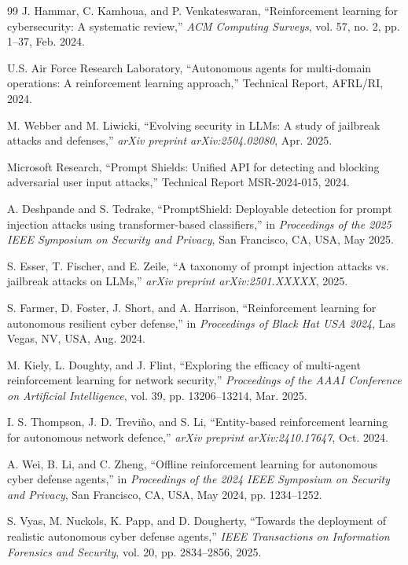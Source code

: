 \documentclass[conference]{IEEEtran}
\begin{document}
\begin{thebibliography}{99}
J. Hammar, C. Kamhoua, and P. Venkateswaran, ``Reinforcement learning for cybersecurity: A systematic review,'' \textit{ACM Computing Surveys}, vol. 57, no. 2, pp. 1--37, Feb. 2024.

U.S. Air Force Research Laboratory, ``Autonomous agents for multi-domain operations: A reinforcement learning approach,'' Technical Report, AFRL/RI, 2024.

M. Webber and M. Liwicki, ``Evolving security in LLMs: A study of jailbreak attacks and defenses,'' \textit{arXiv preprint arXiv:2504.02080}, Apr. 2025.

Microsoft Research, ``Prompt Shields: Unified API for detecting and blocking adversarial user input attacks,'' Technical Report MSR-2024-015, 2024.

A. Deshpande and S. Tedrake, ``PromptShield: Deployable detection for prompt injection attacks using transformer-based classifiers,'' in \textit{Proceedings of the 2025 IEEE Symposium on Security and Privacy}, San Francisco, CA, USA, May 2025.

S. Esser, T. Fischer, and E. Zeile, ``A taxonomy of prompt injection attacks vs. jailbreak attacks on LLMs,'' \textit{arXiv preprint arXiv:2501.XXXXX}, 2025.

S. Farmer, D. Foster, J. Short, and A. Harrison, ``Reinforcement learning for autonomous resilient cyber defense,'' in \textit{Proceedings of Black Hat USA 2024}, Las Vegas, NV, USA, Aug. 2024.

M. Kiely, L. Doughty, and J. Flint, ``Exploring the efficacy of multi-agent reinforcement learning for network security,'' \textit{Proceedings of the AAAI Conference on Artificial Intelligence}, vol. 39, pp. 13206--13214, Mar. 2025.

I. S. Thompson, J. D. Treviño, and S. Li, ``Entity-based reinforcement learning for autonomous network defence,'' \textit{arXiv preprint arXiv:2410.17647}, Oct. 2024.

A. Wei, B. Li, and C. Zheng, ``Offline reinforcement learning for autonomous cyber defense agents,'' in \textit{Proceedings of the 2024 IEEE Symposium on Security and Privacy}, San Francisco, CA, USA, May 2024, pp. 1234--1252.

S. Vyas, M. Nuckols, K. Papp, and D. Dougherty, ``Towards the deployment of realistic autonomous cyber defense agents,'' \textit{IEEE Transactions on Information Forensics and Security}, vol. 20, pp. 2834--2856, 2025.


\end{thebibliography}
\end{document}
